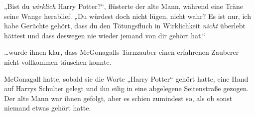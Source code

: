 „Bist du \emph{wirklich} Harry Potter?“, flüsterte der alte Mann, während eine Träne seine Wange herablief.
„Du würdest doch nicht lügen, nicht wahr? Es ist nur, ich habe Gerüchte gehört, dass du den Tötungsfluch in Wirklichkeit \emph{nicht} überlebt hättest und dass deswegen nie wieder jemand von dir gehört hat.“

…wurde ihnen klar, dass McGonagalls Tarnzauber einen erfahrenen Zauberer nicht vollkommen täuschen konnte.

McGonagall hatte, sobald sie die Worte „Harry Potter“ gehört hatte, eine Hand auf Harrys Schulter gelegt und ihn eilig in eine abgelegene Seitenstraße gezogen. Der alte Mann war ihnen gefolgt, aber es schien zumindest so, als ob sonst niemand etwas gehört hatte.

